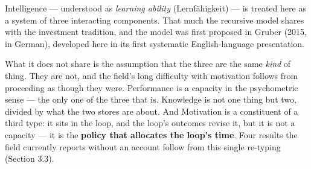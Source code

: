 \documentclass[12pt,a4paper]{article}
\begin{document}
Intelligence ---\hspace{0pt} understood as \emph{learning ability} (Lernf\"ahigkeit) ---\hspace{0pt} is treated here as a system of three interacting components. That much the recursive model shares with the investment tradition, and the model was first proposed in Gruber (2015, in German), developed here in its first systematic English-language presentation.

What it does not share is the assumption that the three are the same \emph{kind} of thing. They are not, and the field's long difficulty with motivation follows from proceeding as though they were. Performance is a capacity in the psychometric sense ---\hspace{0pt} the only one of the three that is. Knowledge is not one thing but two, divided by what the two stores are about. And Motivation is a constituent of a third type: it sits in the loop, and the loop's outcomes revise it, but it is not a capacity ---\hspace{0pt} it is the \textbf{policy that allocates the loop's time}. Four results the field currently reports without an account follow from this single re-typing (Section 3.3).
\end{document}

